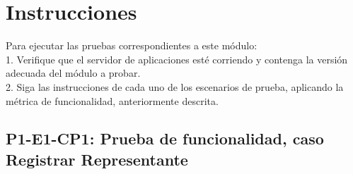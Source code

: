 \documentclass[oneside,10pt]{book}
\begin{document}
\section{Instrucciones}

Para ejecutar las pruebas correspondientes a este módulo: \\

1. Verifique que el servidor de aplicaciones esté corriendo y contenga la versión adecuada del módulo a probar. \\

2. Siga las instrucciones de cada uno de los escenarios de prueba, aplicando la métrica de funcionalidad, anteriormente descrita. \\
\newpage
\subsection{P1-E1-CP1: Prueba de funcionalidad, caso Registrar Representante}
\end{document}
